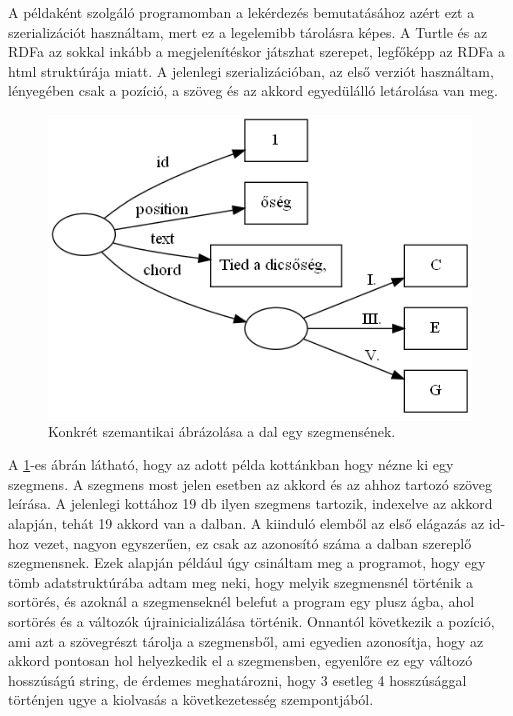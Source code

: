 A példaként szolgáló programomban a lekérdezés bemutatásához azért ezt a szerializációt használtam, mert ez a legelemibb tárolásra képes. A Turtle és az RDFa az sokkal inkább a megjelenítéskor játszhat szerepet, legfőképp az RDFa a html struktúrája miatt. A jelenlegi szerializációban, az első verziót használtam, lényegében csak a pozíció, a szöveg és az akkord egyedülálló letárolása van meg.





\begin{figure}[h]
	\includegraphics[scale=0.5]{images/img_src/rdf_graph_2.png}
	\caption{Konkrét szemantikai ábrázolása a dal egy szegmensének.}
	\label{fig:graph2}
\end{figure}
\par
A \ref{fig:graph2}-es ábrán látható, hogy az adott példa kottánkban hogy nézne ki egy szegmens. A szegmens most jelen esetben az akkord és az ahhoz tartozó szöveg leírása. A jelenlegi kottához 19 db ilyen szegmens tartozik, indexelve az akkord alapján, tehát 19 akkord van a dalban. A kiinduló elemből az első elágazás az id-hoz vezet, nagyon egyszerűen, ez csak az azonosító száma a dalban szereplő szegmensnek. Ezek alapján például úgy csináltam meg a programot, hogy egy tömb adatstruktúrába adtam meg neki, hogy melyik szegmensnél történik a sortörés, és azoknál a szegmenseknél belefut a program egy plusz ágba, ahol sortörés és a változók újrainicializálása történik. Onnantól következik a pozíció, ami azt a szövegrészt tárolja a szegmensből, ami egyedien azonosítja, hogy az akkord pontosan hol helyezkedik el a szegmensben, egyenlőre ez egy változó hosszúságú string, de érdemes meghatározni, hogy 3 esetleg 4 hosszúsággal történjen ugye a kiolvasás a következetesség szempontjából. 
